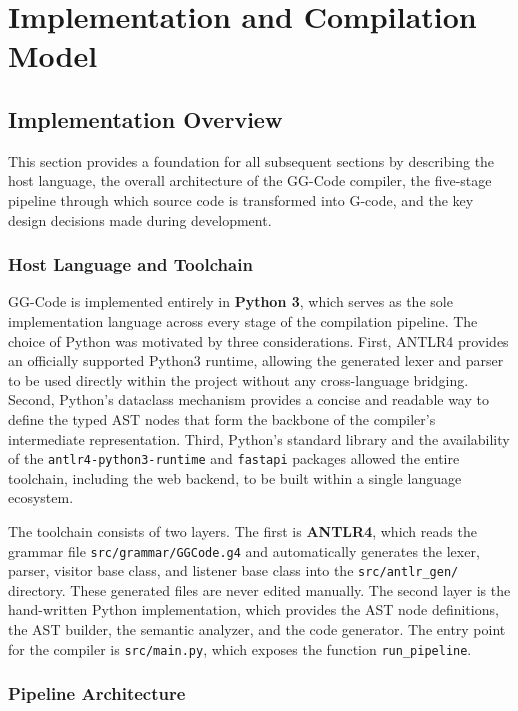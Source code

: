 \chapter{Implementation and Compilation Model}

\section{Implementation Overview}

This section provides a foundation for all subsequent sections by describing the host language, the overall architecture of the GG-Code compiler, the five-stage pipeline through which source code is transformed into G-code, and the key design decisions made during development.

\subsection*{Host Language and Toolchain}

GG-Code is implemented entirely in \textbf{Python 3}, which serves as the sole implementation language across every stage of the compilation pipeline. The choice of Python was motivated by three considerations. First, ANTLR4 provides an officially supported Python3 runtime, allowing the generated lexer and parser to be used directly within the project without any cross-language bridging. Second, Python's dataclass mechanism provides a concise and readable way to define the typed AST nodes that form the backbone of the compiler's intermediate representation. Third, Python's standard library and the availability of the \texttt{antlr4-python3-runtime} and \texttt{fastapi} packages allowed the entire toolchain, including the web backend, to be built within a single language ecosystem.

The toolchain consists of two layers. The first is \textbf{ANTLR4}, which reads the grammar file \texttt{src/grammar/GGCode.g4} and automatically generates the lexer, parser, visitor base class, and listener base class into the \texttt{src/antlr\_gen/} directory. These generated files are never edited manually. The second layer is the hand-written Python implementation, which provides the AST node definitions, the AST builder, the semantic analyzer, and the code generator. The entry point for the compiler is \texttt{src/main.py}, which exposes the function \texttt{run\_pipeline}.

\subsection*{Pipeline Architecture}

